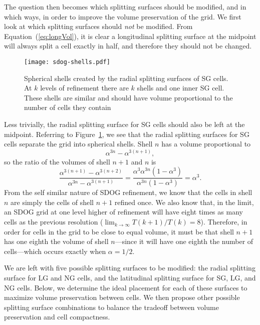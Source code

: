 The question then becomes which splitting surfaces should be modified, and in which ways, in order to improve the volume preservation of the grid.
We first look at which splitting surfaces should \textit{not} be modified.
From Equation~(\ref{eq:longVol}), it is clear a longitudinal splitting surface at the midpoint will always split a cell exactly in half, and therefore they should not be changed.


\begin{figure}[ht!]
	\centering
	\texttt{[image: sdog-shells.pdf]}
	\caption[Title]{
		Spherical shells created by the radial splitting surfaces of SG cells.
		At $k$ levels of refinement there are $k$ shells and one inner SG cell.
		These shells are similar and should have volume proportional to the number of cells they contain
	}
	\label{fig:sdog-shells}
\end{figure}


Less trivially, the radial splitting surface for SG cells should also be left at the midpoint.
Referring to Figure~\ref{fig:sdog-shells}, we see that the radial splitting surfaces for SG cells separate the grid into spherical shells.
Shell $n$ has a volume proportional to
%
\begin{equation*}
\alpha^{3n} - \alpha^{3 \left( n + 1 \right)},
\end{equation*}
%
so the ratio of the volumes of shell $n+1$ and $n$ is
%
\begin{equation*}
\frac{ \alpha^{3 \left(n + 1 \right)} - \alpha^{3\left( n + 2 \right)} }{ \alpha^{3n} - \alpha^{3 \left( n + 1 \right)} } = \frac{ \alpha^{3} \alpha^{3n} \left( 1 - \alpha^{3} \right) }{ \alpha^{3n} \left( 1 - \alpha^{3} \right) } = \alpha^{3}.
\end{equation*}
%
From the self similar nature of SDOG refinement, we know that the cells in shell $n$ are simply the cells of shell $n+1$ refined once.
We also know that, in the limit, an SDOG grid at one level higher of refinement will have eight times as many cells as the previous resolution ($\lim_{k \to \infty} T(k+1) / T(k)  = 8 $).
Therefore, in order for cells in the grid to be close to equal volume, it must be that shell $n+1$ has one eighth the volume of shell $n$---since it will have one eighth the number of cells---which occurs exactly when $\alpha = 1 / 2$.


We are left with five possible splitting surfaces to be modified: the radial splitting surface for LG and NG cells, and the latitudinal splitting surface for SG, LG, and NG cells.
Below, we determine the ideal placement for each of these surfaces to maximize volume preservation between cells.
We then propose other possible splitting surface combinations to balance the tradeoff between volume preservation and cell compactness.


